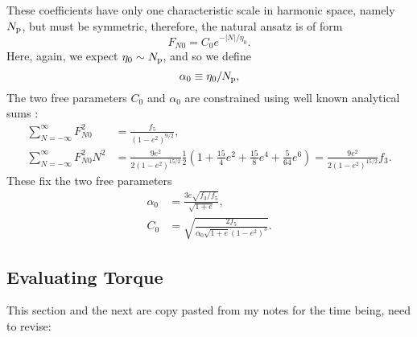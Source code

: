 \documentclass[
        fleqn,
        usenatbib,
        referee,
    ]{mnras}
\newcommand*{\abs}[1]{\left|#1\right|}
\newcommand*{\p}[1]{\left(#1\right)}
\begin{document}
These coefficients have only one characteristic scale in harmonic space, namely
$N_{\rm p}$, but must be symmetric, therefore, the natural ansatz is of form
\begin{equation}
    F_{N0} = C_0 e^{-\abs{N} / \eta_0}.
\end{equation}
Here, again, we expect $\eta_0 \sim N_{\rm p}$, and so we define
\begin{equation}
    \alpha_0 \equiv \eta_0 / N_{\rm p},\label{eq:a0def}
\end{equation}
The two free parameters $C_0$ and $\alpha_0$ are constrained using well known
analytical sums \citep{hut,sl,vlf}:
\begin{align}
    \sum\limits_{N = -\infty}^\infty F_{N0}^2 &= \frac{f_5}{\p{1 - e^2}^{9/2}}
        ,\\
    \sum\limits_{N = -\infty}^\infty F_{N0}^2 N^2
        &= \frac{9e^2}{2\p{1 - e^2}^{15/2}}
            \frac{1}{2}\p{1 + \frac{15}{4}e^2 + \frac{15}{8}e^4
            + \frac{5}{64}e^6}
        = \frac{9e^2}{2\p{1 - e^2}^{15/2}}f_3.
\end{align}
These fix the two free parameters
\begin{align}
    \alpha_0 &= \frac{3e\sqrt{f_3/f_5}}{\sqrt{1 + e}},\\
    C_0 &= \sqrt{\frac{2f_5}{\alpha_0\sqrt{1 + e}\p{1 - e^2}^3}}.
\end{align}

\subsection{Evaluating Torque}

This section and the next are copy pasted from my notes for the time being, need
to revise:
\end{document}
